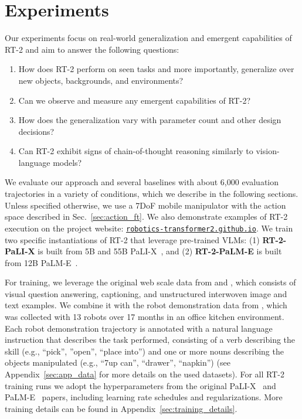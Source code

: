\documentclass[11pt, a4paper, logo, copyright]{deepmind}
\newcommand{\methodname}{RT-2\xspace}
\begin{document}
\section{Experiments}
\label{sec:exp}


Our experiments focus on real-world generalization and emergent capabilities of \methodname and aim to answer the following questions:
\begin{enumerate}
\itemsep0em 
\item How does \methodname perform on seen tasks and more importantly, generalize over new objects, backgrounds, and environments? 
\item Can we observe and measure any emergent capabilities of \methodname?
\item How does the generalization vary with parameter count and other design decisions? 
\item Can \methodname exhibit signs of chain-of-thought reasoning similarly to vision-language models?
\end{enumerate}
We evaluate our approach and several baselines with about 6,000 evaluation trajectories in a variety of conditions, which we describe in the following sections. 
Unless specified otherwise, we use a 7DoF mobile manipulator with the action space described in Sec.~\ref{sec:action_ft}.
We also demonstrate examples of \methodname execution on the project website: \texttt{\href{https://robotics-transformer2.github.io/}{robotics-transformer2.github.io}}. We train two specific instantiations of \methodname that leverage pre-trained VLMs: (1) \textbf{\methodname-PaLI-X} is built from 5B and 55B PaLI-X~\citep{chen2023palix}, and (2) \textbf{\methodname-PaLM-E} is built from 12B PaLM-E~\citep{driess2023palm}.

For training, we leverage the original web scale data from \citet{chen2023palix} and \citet{driess2023palm}, which consists of visual question answering, captioning, and unstructured interwoven image and text examples. We combine it with the robot demonstration data from \citet{brohan2022rt}, which was collected with 13 robots over 17 months in an office kitchen environment.
Each robot demonstration trajectory is annotated with a natural language instruction that describes the task performed, consisting of a verb describing the skill (e.g., ``pick'', ''open'', ``place into'') and one or more nouns describing the objects manipulated (e.g., ``7up can'', ``drawer'', ``napkin'') (see Appendix~\ref{sec:app_data} for more details on the used datasets). For all \methodname training runs we adopt the hyperparameters from the original PaLI-X~\citep{chen2023palix} and PaLM-E~\citep{driess2023palm} papers, including learning rate schedules and regularizations. More training details can be found in Appendix~\ref{sec:training_details}.
\end{document}
